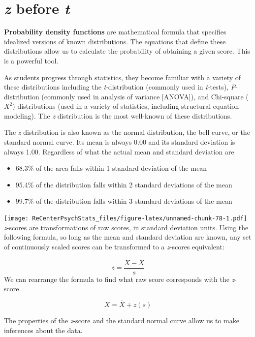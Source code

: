 \documentclass[
  11pt,
]{book}
\providecommand{\tightlist}{%
  \setlength{\itemsep}{0pt}\setlength{\parskip}{0pt}}
\begin{document}
\hypertarget{z-before-t}{%
\section{\texorpdfstring{\emph{z} before \emph{t}}{z before t}}\label{z-before-t}}

\textbf{Probability density functions} are mathematical formula that specifies idealized versions of known distributions. The equations that define these distributions allow us to calculate the probability of obtaining a given score. This is a powerful tool.

As students progress through statistics, they become familiar with a variety of these distributions including the \emph{t}-distribution (commonly used in \emph{t}-tests), \emph{F}-distribution (commonly used in analysis of variance {[}ANOVA{]}), and Chi-square (\(X^2\)) distributions (used in a variety of statistics, including structural equation modeling). The \emph{z} distribution is the most well-known of these distributions.

The \emph{z} distribution is also known as the normal distribution, the bell curve, or the standard normal curve. Its mean is always 0.00 and its standard deviation is always 1.00. Regardless of what the actual mean and standard deviation are

\begin{itemize}
\tightlist
\item
  68.3\% of the area falls within 1 standard deviation of the mean
\item
  95.4\% of the distribution falls within 2 standard deviations of the mean
\item
  99.7\% of the distribution falls within 3 standard deviations of the mean
\end{itemize}

\texttt{[image: ReCenterPsychStats\_files/figure-latex/unnamed-chunk-78-1.pdf]}
\emph{z}-scores are transformations of raw scores, in standard deviation units. Using the following formula, so long as the mean and standard deviation are known, any set of continuously scaled scores can be transformed to a \emph{z}-scores equivalent:

\[z=\frac{X-\bar{X}}{s}\]
We can rearrange the formula to find what raw score corresponds with the \emph{z}-score.

\[X = \bar{X} + z(s)\]

The properties of the \emph{z}-score and the standard normal curve allow us to make inferences about the data.
\end{document}

